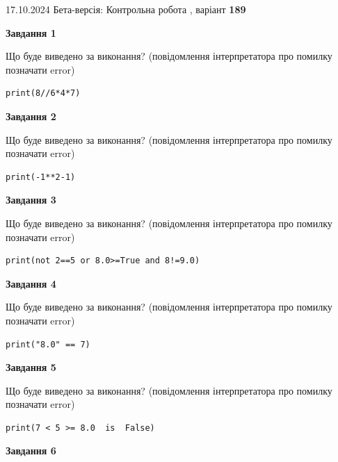 \documentclass[12pt, ukrainian]{article}
\begin{document}
{\Large{17.10.2024 Бета-версія: Контрольна робота , варіант  \No \textbf { 189 }\par}}
{
\begin {large}
{\begin {center}\textbf{Завдання 1}\end {center}}

Що буде виведено за виконання? (повідомлення інтерпретатора про помилку позначати error)\par
\begin{verbatim}
print(8//6*4*7)
\end{verbatim}

{\begin {center}\textbf{Завдання 2}\end {center}}

Що буде виведено за виконання? (повідомлення інтерпретатора про помилку позначати error)\par
\begin{verbatim}
print(-1**2-1)
\end{verbatim}

{\begin {center}\textbf{Завдання 3}\end {center}}

Що буде виведено за виконання? (повідомлення інтерпретатора про помилку позначати error)\par
\begin{verbatim}
print(not 2==5 or 8.0>=True and 8!=9.0)
\end{verbatim}

{\begin {center}\textbf{Завдання 4}\end {center}}

Що буде виведено за виконання? (повідомлення інтерпретатора про помилку позначати error)\par
\begin{verbatim}
print("8.0" == 7)
\end{verbatim}

{\begin {center}\textbf{Завдання 5}\end {center}}

Що буде виведено за виконання? (повідомлення інтерпретатора про помилку позначати error)\par
\begin{verbatim}
print(7 < 5 >= 8.0  is  False)
\end{verbatim}

{\begin {center}\textbf{Завдання 6}\end {center}}


\end{large}}
\end{document}
